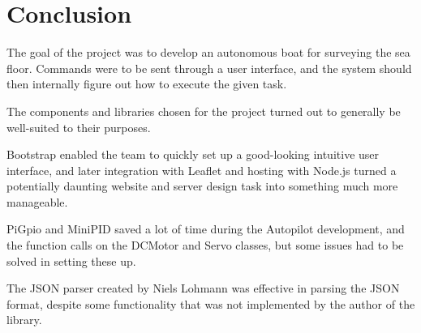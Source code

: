 \newpage
\chapter{Conclusion}
The goal of the project was to develop an autonomous boat for surveying the sea floor. Commands were to be sent through a user interface, and the system should then internally figure out how to execute the given task. 

The components and libraries chosen for the project turned out to generally be well-suited to their purposes. 

Bootstrap enabled the team to quickly set up a good-looking intuitive user interface, and later integration with Leaflet and hosting with Node.js turned a potentially daunting website and server design task into something much more manageable. 

PiGpio and MiniPID saved a lot of time during the Autopilot development, and the function calls on the DCMotor and Servo classes, but some issues had to be solved in setting these up. 

The JSON parser created by Niels Lohmann was effective in parsing the JSON format, despite some functionality that was not implemented by the author of the library. 

